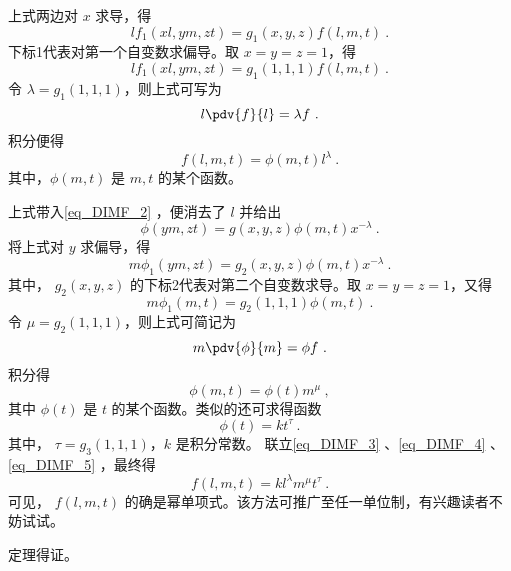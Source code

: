 上式两边对 $x$ 求导，得
\begin{equation}
lf_1(xl,ym,zt)=g_1(x,y,z)f(l,m,t)~.
\end{equation}
下标1代表对第一个自变数求偏导。取 $x=y=z=1$，得
\begin{equation}
lf_1(xl,ym,zt)=g_1(1,1,1)f(l,m,t)~.
\end{equation}
令 $\lambda=g_1(1,1,1)$，则上式可写为
\begin{equation}
l\pdv{f}{l}=\lambda f~.
\end{equation}
积分便得 
\begin{equation}\label{eq_DIMF_3}
f(l,m,t)=\phi(m,t)l^{\lambda}~.
\end{equation}
其中，$\phi(m,t)$ 是 $m,t$ 的某个函数。

上式带入\autoref{eq_DIMF_2} ，便消去了 $l$ 并给出
\begin{equation}
\phi(ym,zt)=g(x,y,z)\phi(m,t)x^{-\lambda}~.
\end{equation}
将上式对 $y$ 求偏导，得
\begin{equation}
m\phi_1(ym,zt)=g_2(x,y,z)\phi(m,t)x^{-\lambda}~.
\end{equation}
其中， $g_2(x,y,z)$ 的下标2代表对第二个自变数求导。取 $x=y=z=1$，又得
\begin{equation}
m\phi_1(m,t)=g_2(1,1,1)\phi(m,t)~.
\end{equation}
令 $\mu=g_2(1,1,1)$，则上式可简记为
\begin{equation}
m\pdv{\phi}{m}=\phi f~.
\end{equation}
积分得
\begin{equation}\label{eq_DIMF_4}
\phi(m,t)=\phi(t)m^{\mu}~,
\end{equation}
其中 $\phi(t)$ 是 $t$ 的某个函数。类似的还可求得函数
\begin{equation}\label{eq_DIMF_5}
\phi(t)=kt^{\tau}~.
\end{equation}
其中， $\tau=g_3(1,1,1)$，$k$ 是积分常数。
联立\autoref{eq_DIMF_3} 、\autoref{eq_DIMF_4} 、\autoref{eq_DIMF_5} ，最终得
\begin{equation}
f(l,m,t)=kl^{\lambda}m^{\mu}t^{\tau}~.
\end{equation}
可见， $f(l,m,t)$ 的确是幂单项式。该方法可推广至任一单位制，有兴趣读者不妨试试。

定理得证。

